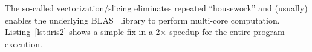 

The so-called vectorization/slicing eliminates repeated ``housework'' and (usually) enables the underlying BLAS~\cite{blackford2002updated} library to perform multi-core computation. Listing~\ref{lst:iris2} shows a simple fix in a 2$\times$ speedup for the entire program execution. 







\begin{comment}

compared with slice notation. A indexing operation ({\tt []}) triggers one \ff, which is expensive because it involves a few additional operations to the array, such as data type verification and boundary safety check\footnote{General function for indexing Numpy array: \url{https://github.com/numpy/numpy/blob/master/numpy/core/src/multiarray/mapping.c\#L1506}}. Iterating arrays via loops invokes proportional times of indexing operations, causing massive number of \ffs. Compared with applying loops, slice notation only involves one indexing operation, which is much more efficient.

What's more, slice notation gathers data from a consecutive memory range in raw data region, leading to a good data locality.





To achieve scalable indexing, we replace the loop with slice notation, shown in Listing~\ref{lst:iris2}, yielding a 2.02$\times$ function speedup.
\end{comment}


